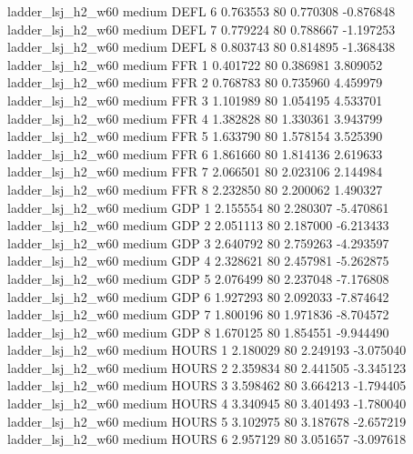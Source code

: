   ladder_lsj_h2_w60     medium     DEFL                 6  0.763553 80       0.770308          -0.876848
  ladder_lsj_h2_w60     medium     DEFL                 7  0.779224 80       0.788667          -1.197253
  ladder_lsj_h2_w60     medium     DEFL                 8  0.803743 80       0.814895          -1.368438
  ladder_lsj_h2_w60     medium      FFR                 1  0.401722 80       0.386981           3.809052
  ladder_lsj_h2_w60     medium      FFR                 2  0.768783 80       0.735960           4.459979
  ladder_lsj_h2_w60     medium      FFR                 3  1.101989 80       1.054195           4.533701
  ladder_lsj_h2_w60     medium      FFR                 4  1.382828 80       1.330361           3.943799
  ladder_lsj_h2_w60     medium      FFR                 5  1.633790 80       1.578154           3.525390
  ladder_lsj_h2_w60     medium      FFR                 6  1.861660 80       1.814136           2.619633
  ladder_lsj_h2_w60     medium      FFR                 7  2.066501 80       2.023106           2.144984
  ladder_lsj_h2_w60     medium      FFR                 8  2.232850 80       2.200062           1.490327
  ladder_lsj_h2_w60     medium      GDP                 1  2.155554 80       2.280307          -5.470861
  ladder_lsj_h2_w60     medium      GDP                 2  2.051113 80       2.187000          -6.213433
  ladder_lsj_h2_w60     medium      GDP                 3  2.640792 80       2.759263          -4.293597
  ladder_lsj_h2_w60     medium      GDP                 4  2.328621 80       2.457981          -5.262875
  ladder_lsj_h2_w60     medium      GDP                 5  2.076499 80       2.237048          -7.176808
  ladder_lsj_h2_w60     medium      GDP                 6  1.927293 80       2.092033          -7.874642
  ladder_lsj_h2_w60     medium      GDP                 7  1.800196 80       1.971836          -8.704572
  ladder_lsj_h2_w60     medium      GDP                 8  1.670125 80       1.854551          -9.944490
  ladder_lsj_h2_w60     medium    HOURS                 1  2.180029 80       2.249193          -3.075040
  ladder_lsj_h2_w60     medium    HOURS                 2  2.359834 80       2.441505          -3.345123
  ladder_lsj_h2_w60     medium    HOURS                 3  3.598462 80       3.664213          -1.794405
  ladder_lsj_h2_w60     medium    HOURS                 4  3.340945 80       3.401493          -1.780040
  ladder_lsj_h2_w60     medium    HOURS                 5  3.102975 80       3.187678          -2.657219
  ladder_lsj_h2_w60     medium    HOURS                 6  2.957129 80       3.051657          -3.097618
